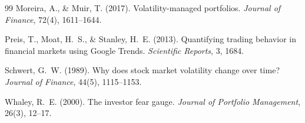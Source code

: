 \documentclass[12pt,a4paper]{article}
\begin{document}
\begin{thebibliography}{99}
Moreira, A., \& Muir, T. (2017). Volatility-managed portfolios. \textit{Journal of Finance}, 72(4), 1611--1644.

Preis, T., Moat, H.~S., \& Stanley, H.~E. (2013). Quantifying trading behavior in financial markets using Google Trends. \textit{Scientific Reports}, 3, 1684.

Schwert, G.~W. (1989). Why does stock market volatility change over time? \textit{Journal of Finance}, 44(5), 1115--1153.

Whaley, R.~E. (2000). The investor fear gauge. \textit{Journal of Portfolio Management}, 26(3), 12--17.

\end{thebibliography}
\end{document}

